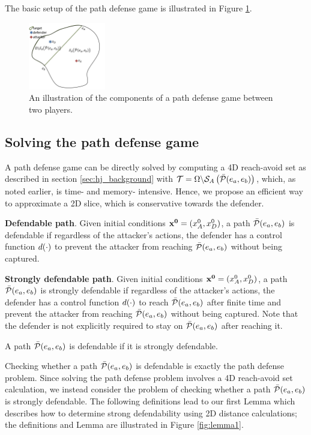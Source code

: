 The basic setup of the path defense game is illustrated in Figure \ref{fig:pd_form}.
\begin{figure}[H]
\centering
\includegraphics[width=0.3\textwidth]{"fig/path defense game"}
\caption{An illustration of the components of a path defense game between two players.}
\label{fig:pd_form}
\end{figure}

\subsection{Solving the path defense game}
A path defense game can be directly solved by computing a 4D reach-avoid set as described in section \ref{sec:hj_background} with $\mathcal{T}=\Omega\backslash\mathcal{S}_A\left(\bar{\mathcal{P}}(e_a,e_b)\right)$, which, as noted earlier, is time- and memory- intensive. Hence, we propose an efficient way to approximate a 2D slice, which is conservative towards the defender.

\begin{defn} %
\textbf{Defendable path}. Given initial conditions $\mathbf{x^0}=(x_A^0,x_D^0)$, a path $\bar{\mathcal{P}}(e_a,e_b)$ is defendable if regardless of the attacker's actions, the defender has a control function $d(\cdot)$ to prevent the attacker from reaching $\bar{\mathcal{P}}(e_a,e_b)$ without being captured.
\end{defn}

\begin{defn} %
\textbf{Strongly defendable path}. Given initial conditions $\mathbf{x^0}=(x_A^0,x_D^0)$, a path $\bar{\mathcal{P}}(e_a,e_b)$ is strongly defendable if regardless of the attacker's actions, the defender has a control function $d(\cdot)$ to reach $\bar{\mathcal{P}}(e_a,e_b)$ after finite time and prevent the attacker from reaching $\bar{\mathcal{P}}(e_a,e_b)$ without being captured. Note that the defender is not explicitly required to stay on $\bar{\mathcal{P}}(e_a,e_b)$ after reaching it.
\end{defn}

\begin{rem}
A path $\bar{\mathcal{P}}(e_a,e_b)$ is defendable if it is strongly defendable.
\end{rem}

Checking whether a path $\bar{\mathcal{P}}(e_a,e_b)$ is defendable is exactly the path defense problem. Since solving the path defense problem involves a 4D reach-avoid set calculation, we instead consider the problem of checking whether a path $\bar{\mathcal{P}}(e_a,e_b)$ is strongly defendable. The following definitions lead to our first Lemma which describes how to determine strong defendability using 2D distance calculations; the definitions and Lemma are illustrated in Figure \ref{fig:lemma1}.

